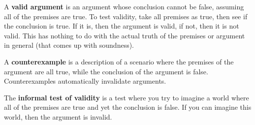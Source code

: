 \begin{readingnotes}
	A \textbf{valid argument} is an argument whose conclusion cannot be false,
	assuming all of the premises are true. To test validity, take all premises as
	true, then see if the conclusion is true. If it is, then the argument is valid,
	if not, then it is not valid. This has nothing to do with the actual truth
	of the premises or argument in general (that comes up with soundness).

	A \textbf{counterexample} is a description of a scenario where the premises of
	the argument are all true, while the conclusion of the argument is false.
	Counterexamples automatically invalidate arguments.

	The \textbf{informal test of validity} is a test where you try to imagine
	a world where all of the premises are true and yet the conclusion is false.
	If you can imagine this world, then the argument is invalid.
\end{readingnotes}
